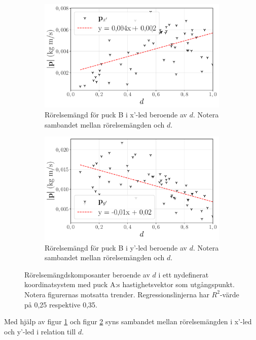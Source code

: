 \begin{figure}[H]
    
    \begin{subfigure}{.45\textwidth}
        \centering
        \hspace*{-1.2cm}
        \includegraphics[width=1.2\linewidth]{images/d_pxled.pdf} %
        \caption{Rörelsemängd för puck B i x'-led beroende av $d$. Notera sambandet mellan rörelsemängden och $d$.}
        \label{fig:px}
    \end{subfigure} 
    \hfill
    \begin{subfigure}{.45\textwidth}
        \centering
        \hspace*{-1.2cm}
        \includegraphics[width=1.2\linewidth]{images/d_pyled.pdf} %
        \caption{Rörelsemängd för puck B i y'-led beroende av $d$. Notera sambandet mellan rörelsemängden och $d$.}
        \label{fig:py}
    \end{subfigure}
    \caption{Rörelsemängdskomposanter beroende av $d$ i ett nydefinerat koordinatsystem med puck A:s hastighetsvektor som utgångspunkt. Notera figurernas motsatta trender. Regressionslinjerna har $R^2$-värde på 0,25 respektive 0,35.}
    \label{fig:rörelsemängd}
\end{figure}
Med hjälp av figur \ref{fig:px} och figur \ref{fig:py} syns sambandet mellan rörelsemängden i x'-led och y'-led i relation till $d$.


